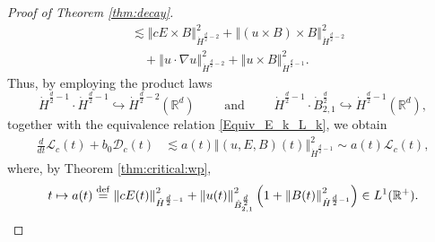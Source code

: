 \documentclass[11pt, leqno, a4paper,]{amsart}
\theoremstyle{remark}
\numberwithin{equation}{section}
\newcommand*{\bydef}{\overset{\rm def}{=}}
\newcommand*{\norm}[1]{\left\Vert #1\right\Vert}
\begin{document}
\begin{proof}[Proof of Theorem \ref{thm:decay}]
\begin{equation*}
\begin{aligned}
 	& \lesssim \norm {cE\times B}_{\dot H^{\frac{d}{2}-2}}^2 + \norm {( u\times B) \times B}_{\dot H^{\frac{d}{2}-2}}^2
 	\\
 	& \quad  + \norm { u\cdot \nabla u}_{\dot H^{\frac{d}{2}-2}}^2 + \norm { u\times B }_{\dot H^{\frac{d}{2}-1}}^2.
 \end{aligned}
\end{equation*}
Thus, by employing the product laws 
\begin{equation*}
	\dot H^{\frac{d}{2}-1} \cdot\dot H^{\frac{d}{2}-1}\hookrightarrow \dot H^{\frac{d}{2}-2}(\mathbb R^d) \qquad \text{ and } \qquad \dot H^{\frac{d}{2}-1} \cdot \dot B^{\frac{d}{2}}_{2,1} \hookrightarrow \dot H^{\frac{d}{2}-1} (\mathbb R^d),
\end{equation*}
together with the equivalence relation \eqref{Equiv_E_k_L_k}, we obtain 
\begin{equation*}
 \begin{aligned}
 	\frac{d}{dt} \mathcal{L}_c(t) + b_0\mathcal{D}_c(t) 
 	&\lesssim a(t) \norm {(u,E,B)(t)}_{\dot H^{\frac{d}{2}-1}}^2 \sim a(t)  \mathcal{L}_c(t),
 \end{aligned}
\end{equation*}
where, by Theorem \ref{thm:critical:wp},
\begin{equation*}
	t\mapsto a(t) \bydef \norm {cE(t)}_{\dot H^{\frac{d}{2}-1}}^2+ \norm { u(t)}_{\dot B^{\frac{d}{2}}_{2,1}}^2 \left (1+ \norm {B(t)}_{\dot H^{\frac{d}{2}-1}}^2 \right) \in L^1(\mathbb R^+).
\end{equation*} 


\end{proof}
\end{document}

